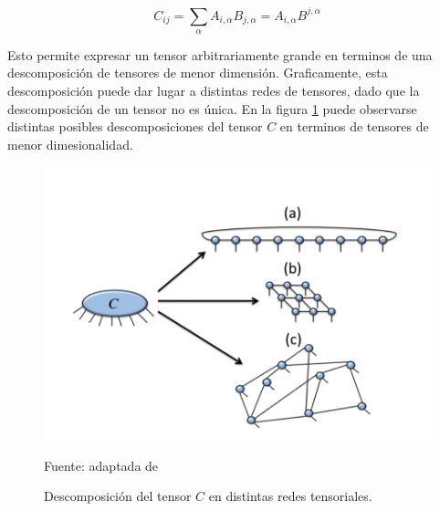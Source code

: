 \begin{equation}
    C_{i j} = \sum_{\alpha} A_{i , \alpha} B_{j, \alpha} = A_{i , \alpha} B^{j, \alpha}
    \label{eq:contracction}
\end{equation}

Esto permite expresar un tensor arbitrariamente grande en terminos de una descomposición de tensores de menor dimensión. Graficamente, esta descomposición puede dar lugar a distintas redes de tensores, dado que la descomposición de un tensor no es única. En la figura \ref{fig:c_descomposition} puede observarse distintas posibles descomposiciones del tensor $C$ en terminos de tensores de menor dimesionalidad.


\begin{figure}[!ht]
    \centering
    \includegraphics[scale = 0.7]{img/03-tensor_descomposicion.png}
    \caption{Descomposición del tensor $C$ en distintas redes tensoriales.}
    Fuente: adaptada de \citep{orus} 
    \label{fig:c_descomposition}
\end{figure}

\newpage

